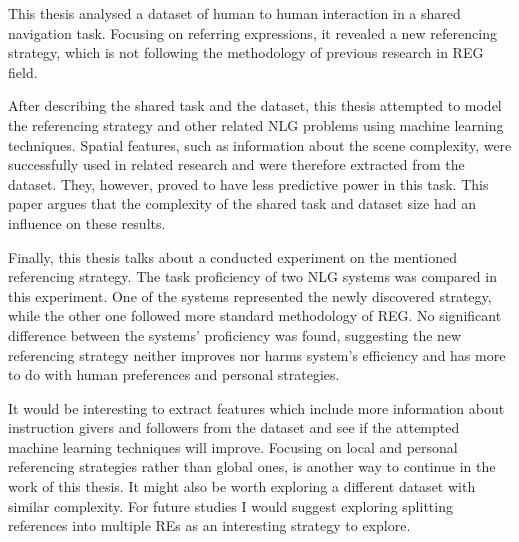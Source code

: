 This thesis analysed a dataset of human to human interaction in a shared navigation task. Focusing on referring expressions, it revealed a new referencing strategy, which is not following the methodology of previous research in REG field. 

After describing the shared task and the dataset, this thesis attempted to model the referencing strategy and other related NLG problems using machine learning techniques. Spatial features, such as information about the scene complexity, were successfully used in related research and were therefore extracted from the dataset. They, however, proved to have less predictive power in this task. This paper argues that the complexity of the shared task and dataset size had an influence on these results.

Finally, this thesis talks about a conducted experiment on the mentioned referencing strategy. The task proficiency of two NLG systems was compared in this experiment. One of the systems represented the newly discovered strategy, while the other one followed more standard methodology of REG. No significant difference between the systems' proficiency was found, suggesting the new referencing strategy neither improves nor harms system's efficiency and has more to do with human preferences and personal strategies.

It would be interesting to extract features which include more information about instruction givers and followers from the dataset and see if the attempted machine learning techniques will improve. Focusing on local and personal referencing strategies rather than global ones, is another way to continue in the work of this thesis. It might also be worth exploring a different dataset with similar complexity. For future studies I would suggest exploring splitting references into multiple REs as an interesting strategy to explore.

